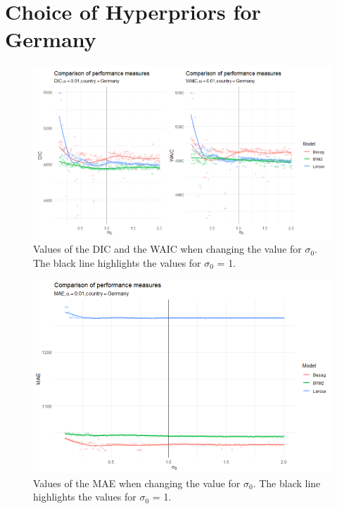 \section{Choice of Hyperpriors for Germany}
\begin{figure}[H]
    \centering
    \includegraphics[width = \textwidth]{comparison_1_germany.png}
    \caption{Values of the DIC and the WAIC when changing the value for $\sigma_0$. The black line highlights the values for $\sigma_0$ = 1.}
    \label{comparison_germany_1}
\end{figure}
\begin{figure}[H]
    \centering
    \includegraphics[width = \textwidth]{mae_germany.png}
    \caption{Values of the MAE when changing the value for $\sigma_0$. The black line highlights the values for $\sigma_0$ = 1.}
    \label{comparison_germany_2}
\end{figure}

